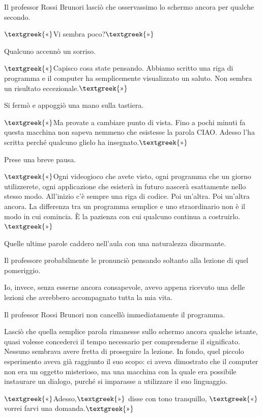 \documentclass{article}
\begin{document}
Il professor Rossi Brunori lasciò che osservassimo lo schermo ancora per qualche secondo.

$\text{\textgreek{«}}$Vi sembra poco?$\text{\textgreek{»}}$

Qualcuno accennò un sorriso.

$\text{\textgreek{«}}$Capisco cosa state pensando. Abbiamo scritto una riga di programma e il computer ha semplicemente
visualizzato un saluto. Non sembra un risultato eccezionale.$\text{\textgreek{»}}$

Si fermò e appoggiò una mano sulla tastiera.

$\text{\textgreek{«}}$Ma provate a cambiare punto di vista. Fino a pochi minuti fa questa macchina non sapeva nemmeno
che esistesse la parola {\textquotedbl}CIAO{\textquotedbl}. Adesso l'ha scritta perché qualcuno glielo ha
insegnato.$\text{\textgreek{»}}$

Prese una breve pausa.

$\text{\textgreek{«}}$Ogni videogioco che avete visto, ogni programma che un giorno utilizzerete, ogni applicazione che
esisterà in futuro nascerà esattamente nello stesso modo. All'inizio c'è sempre una riga di codice. Poi un'altra. Poi
un'altra ancora. La differenza tra un programma semplice e uno straordinario non è il modo in cui comincia. È la
pazienza con cui qualcuno continua a costruirlo.$\text{\textgreek{»}}$

Quelle ultime parole caddero nell'aula con una naturalezza disarmante.

Il professore probabilmente le pronunciò pensando soltanto alla lezione di quel pomeriggio.

Io, invece, senza esserne ancora consapevole, avevo appena ricevuto una delle lezioni che avrebbero accompagnato tutta
la mia vita.

Il professor Rossi Brunori non cancellò immediatamente il programma.

Lasciò che quella semplice parola rimanesse sullo schermo ancora qualche istante, quasi volesse concederci il tempo
necessario per comprenderne il significato. Nessuno sembrava avere fretta di proseguire la lezione. In fondo, quel
piccolo esperimento aveva già raggiunto il suo scopo: ci aveva dimostrato che il computer non era un oggetto
misterioso, ma una macchina con la quale era possibile instaurare un dialogo, purché si imparasse a utilizzare il suo
linguaggio.

$\text{\textgreek{«}}$Adesso,$\text{\textgreek{»}}$ disse con tono tranquillo, $\text{\textgreek{«}}$vorrei farvi una
domanda.$\text{\textgreek{»}}$
\end{document}

